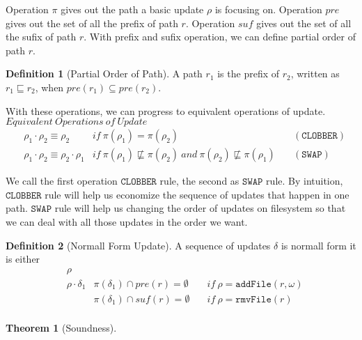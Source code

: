 \documentclass[10pt,twoside,a4paper]{article}
\theoremstyle{theorem}
\newtheorem{theorem}{Theorem}[section]
\theoremstyle{lemma}
\theoremstyle{property}
\theoremstyle{definition}
\newtheorem{definition}{Definition}[section]
\theoremstyle{assumption}
\begin{document}
Operation $\pi$ gives out the path a basic update $\rho$ is focusing on.
Operation $pre$ gives out the set of all the prefix of path $r$.
Operation $suf$ gives out the set of all the sufix of path $r$.
With prefix and sufix operation, we can define partial order of path $r$.

\begin{definition}[Partial Order of Path]
	A path $r_1$ is the prefix of $r_2$, written as $r_1 \sqsubseteq r_2$, when $pre(r_1) \subseteq pre(r_2)$.
\end{definition}

With these operations, we can progress to equivalent operations of update.\\

$\boxed{Equivalent ~Operations ~of ~Update}$
\begin{align*}
	& \rho_1 \cdot \rho_2 \equiv \rho_2  & if~ \pi(\rho_1) = \pi(\rho_2) \quad & (\mathtt{CLOBBER})\\
	& \rho_1 \cdot \rho_2 \equiv \rho_2 \cdot \rho_1  & if~ \pi(\rho_1) \not\sqsubseteq \pi(\rho_2) ~and~ \pi(\rho_2) \not\sqsubseteq \pi(\rho_1) \quad & (\mathtt{SWAP})
\end{align*}

We call the first operation $\mathtt{CLOBBER}$ rule, the second as $\mathtt{SWAP}$ rule. 
By intuition, $\mathtt{CLOBBER}$ rule will help us economize the sequence of updates that happen in one path.
$\mathtt{SWAP}$ rule will help us changing the order of updates on filesystem so that we can deal with all those updates in the order we want.\\

\newpage

\begin{definition}[Normall Form Update]
	A sequence of updates $\delta$ is normall form it is either
	\begin{align*}
		& \rho\\
		& \rho \cdot \delta_1 & \pi(\delta_1) \cap pre(r) = \emptyset \quad & if~\rho = \mathtt{addFile}(r,\omega)\\
		& 					  & \pi(\delta_1) \cap suf(r) = \emptyset \quad & if~\rho = \mathtt{rmvFile}(r)\\
	\end{align*}
\end{definition}

\begin{theorem}[Soundness]
\end{theorem}
\end{document}
